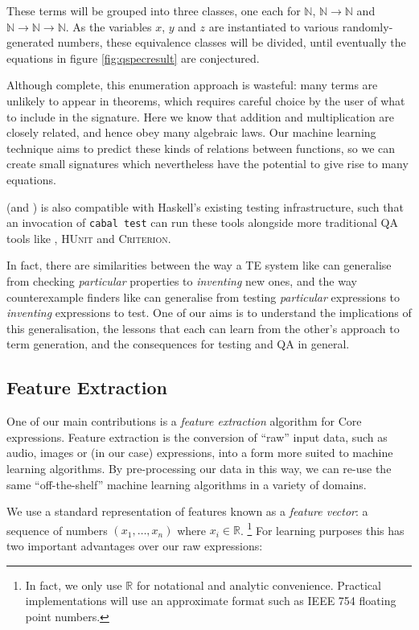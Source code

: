 These terms will be grouped into three classes, one each for $\mathbb{N}$, $\mathbb{N} \rightarrow \mathbb{N}$ and $\mathbb{N} \rightarrow \mathbb{N} \rightarrow \mathbb{N}$. As the variables $x$, $y$ and $z$ are instantiated to various randomly-generated numbers, these equivalence classes will be divided, until eventually the equations in figure \ref{fig:qspecresult} are conjectured.

Although complete, this enumeration approach is wasteful: many terms are unlikely to appear in theorems, which requires careful choice by the user of what to include in the signature. Here we know that addition and multiplication are closely related, and hence obey many algebraic laws. Our machine learning technique aims to predict these kinds of relations between functions, so we can create small signatures which nevertheless have the potential to give rise to many equations.

\qspec{} (and \hspec{}) is also compatible with Haskell's existing testing infrastructure, such that an invocation of \texttt{cabal test} can run these tools alongside more traditional QA tools like \qcheck{}, \textsc{HUnit} and \textsc{Criterion}.

In fact, there are similarities between the way a TE system like \qspec{} can generalise from checking \emph{particular} properties to \emph{inventing} new ones, and the way counterexample finders like \qcheck{} can generalise from testing \emph{particular} expressions to \emph{inventing} expressions to test. One of our aims is to understand the implications of this generalisation, the lessons that each can learn from the other's approach to term generation, and the consequences for testing and QA in general.

\subsection{Feature Extraction}
\label{sec:featureextraction}

One of our main contributions is a \emph{feature extraction} algorithm for Core expressions. Feature extraction is the conversion of ``raw'' input data, such as audio, images or (in our case) expressions, into a form more suited to machine learning algorithms. By pre-processing our data in this way, we can re-use the same ``off-the-shelf'' machine learning algorithms in a variety of domains.

We use a standard representation of features known as a \emph{feature vector}: a sequence of numbers $(x_1, \dots, x_n)$ where $x_i \in \mathbb{R}$. \footnote{In fact, we only use $\mathbb{R}$ for notational and analytic convenience. Practical implementations will use an approximate format such as IEEE 754 floating point numbers.} For learning purposes this has two important advantages over our raw expressions:

